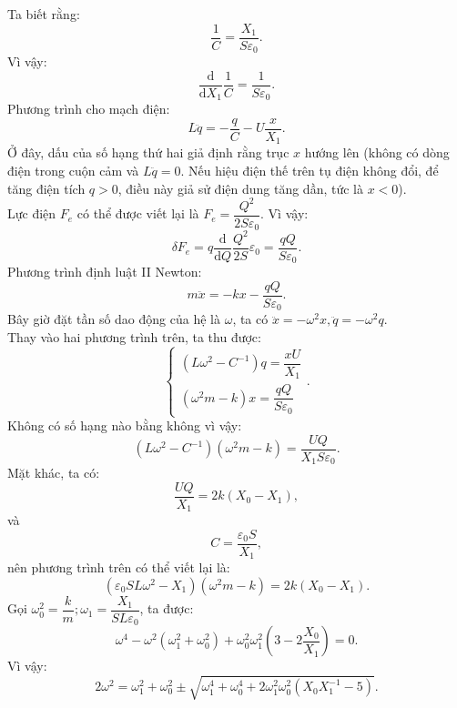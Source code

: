 \begin{loigiai}
\begin{enumerate}[1)]
Ta biết rằng:
\[
\dfrac{1}{C}=\dfrac{X_1}{S \varepsilon_{0}}.\]
Vì vậy:
\[\dfrac{\mathrm{d}}{\mathrm{d}X_1}\dfrac{1}{C}=\dfrac{1}{S \varepsilon_0}.\]
Phương trình cho mạch điện:
\[L \ddot{q}=-\dfrac{q}{C}-U \dfrac{x}{X_{1}}.\]
Ở đây, dấu của số hạng thứ hai giả định rằng trục $x $ hướng lên (không có dòng điện trong cuộn cảm và $L\ddot q = 0$. Nếu hiệu điện thế trên tụ điện không đổi, để tăng điện tích $q> 0$, điều này giả sử điện dung tăng dần, tức là $x <0$).\\
Lực điện $F_e$ có thể được viết lại là $F_e=\dfrac{Q^2}{2S \varepsilon_0}$.
Vì vậy:
\[\delta F_{e}=q \frac{\mathrm{d}}{\mathrm{d} Q} \dfrac{Q^{2}}{2 S} \varepsilon_{0}=\dfrac{qQ}{S \varepsilon_{0}}.\]
Phương trình định luật II Newton:
\[
m \ddot{x}=-k x - \dfrac{q Q}{S \varepsilon_{0}}.
\]
Bây giờ đặt tần số dao động của hệ là $\omega$, ta có $\ddot{x}=-\omega^{2} x,  \ddot{q}=-\omega^{2} q$.\\
Thay vào hai phương trình trên, ta thu được:
\[
\left\{\begin{aligned}
\left(L \omega^{2}-C^{-1}\right) q= \dfrac{xU}{X_{1}}  \\
\left(\omega^{2} m-k\right) x=\dfrac{q Q }{S \varepsilon_{0}} 
\end{aligned}\right..
\]
Không có số hạng nào bằng không vì vậy:
\[
\left(L \omega^{2}-C^{-1}\right)\left(\omega^{2} m-k\right)=\dfrac{U Q}{X_{1} S \varepsilon_{0}}.
\]
Mặt khác, ta có:
\[\dfrac{U Q}{X_{1}}=2 k\left(X_{0}-X_{1}\right),\]
và
\[C=\dfrac{\varepsilon_{0} S}{X_{1}},\]
nên phương trình trên có thể viết lại là:
\[\left(\varepsilon_{0} S L \omega^{2}-X_{1}\right)\left(\omega^{2} m-k\right)=2 k\left(X_{0}-X_{1}\right).\]
Gọi $\omega_{0}^2=\dfrac{k}{m}; \omega_{1}=\dfrac{X_1}{SL \varepsilon_0}$, ta được:
\[\omega^{4}-\omega^{2}\left(\omega_{1}^{2}+\omega_{0}^{2}\right)+\omega_{0}^{2} \omega_{1}^{2}\left(3-2 \frac{X_{0}}{X_{1}}\right)=0.\]
Vì vậy:
\[2 \omega^{2}=\omega_{1}^{2}+\omega_{0}^{2} \pm \sqrt{\omega_{1}^{4}+\omega_{0}^{4}+2 \omega_{1}^{2} \omega_{0}^{2}\left(X_{0} X_{1}^{-1}-5\right)}.
\]
\end{enumerate}
\end{loigiai}

